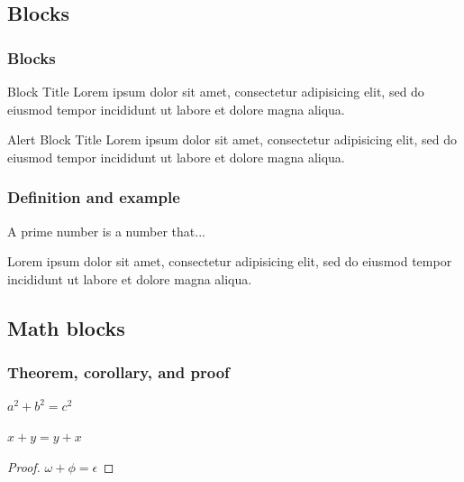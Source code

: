 \documentclass[sans,10pt]{beamer}
\begin{document}
\subsection{Blocks}

\begin{frame}
\frametitle{Blocks}
\begin{block}{Block Title}
Lorem ipsum dolor sit amet, consectetur adipisicing elit, sed do eiusmod tempor incididunt ut labore et dolore magna aliqua.
\end{block}
\begin{alertblock}{Alert Block Title}
Lorem ipsum dolor sit amet, consectetur adipisicing elit, sed do eiusmod tempor incididunt ut labore et dolore magna aliqua.
\end{alertblock}
\end{frame}


\begin{frame}
\frametitle{Definition and example}
\begin{definition}
A prime number is a number that...
\end{definition}
\begin{example}
Lorem ipsum dolor sit amet, consectetur adipisicing elit, sed do eiusmod tempor incididunt ut labore et dolore magna aliqua.
\end{example}   
\end{frame}

\subsection{Math blocks}

\begin{frame}
\frametitle{Theorem, corollary, and proof}
\begin{theorem}[Pythagoras] 
$ a^2 + b^2 = c^2$
\end{theorem}
\begin{corollary}
$ x + y = y + x  $
\end{corollary}
\begin{proof}
$\omega +\phi = \epsilon $
\end{proof}
\end{frame}

\end{document}
